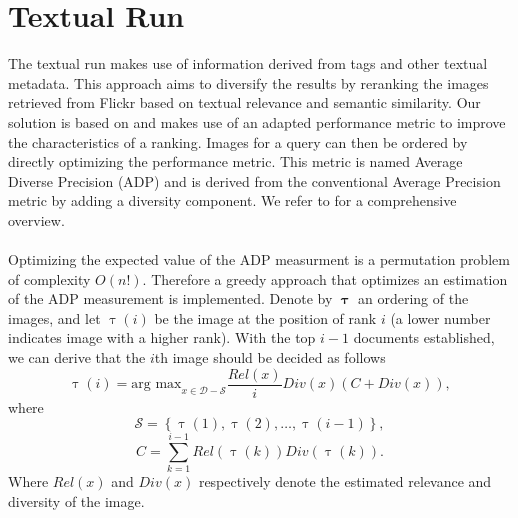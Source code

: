\documentclass{acm_proc_article-me11_tweaked}
\begin{document}
\section{Textual Run}
The textual run makes use of information derived from tags and other textual metadata.
This approach aims to diversify the results by reranking the images retrieved from Flickr based on textual relevance and semantic similarity.
Our solution is based on \cite{textual-diversification} and makes use of an adapted performance metric to improve the characteristics of a ranking.
Images for a query can then be ordered by directly optimizing the performance metric.
This metric is named Average Diverse Precision (ADP) and is derived from the conventional Average Precision metric by adding a diversity component.
We refer to \cite{textual-diversification} for a comprehensive overview.
\\\\
Optimizing the expected value of the ADP measurment is a permutation problem of complexity $O(n!)$. 
Therefore a greedy approach that optimizes an estimation of the ADP measurement is implemented. 
Denote by $\pmb\uptau$ an ordering of the images, and let $\uptau(i)$ be the image at the position of rank $i$ (a lower number indicates image with a higher rank).
With the top $ i - 1 $ documents established, we can derive that the $i$th image should be decided as follows
\begin{equation}
 \displaystyle
  \uptau(i) = \text{arg max}_{x \in \mathscr{D} - \mathscr{S} } \frac{Rel(x)}{i} Div(x) ( C + Div(x) ),
\end{equation}
where
\begin{equation}
\mathscr{S} = \left\{\uptau(1), \uptau(2), \ldots , \uptau(i - 1)\right\} ,
\end{equation}
\begin{equation}
C = \sum^{i-1}_{k=1} Rel(\uptau(k)) Div(\uptau(k)).
\end{equation}
Where $Rel(x)$ and $Div(x)$ respectively denote the estimated relevance and diversity of the image.

%
\end{document}
